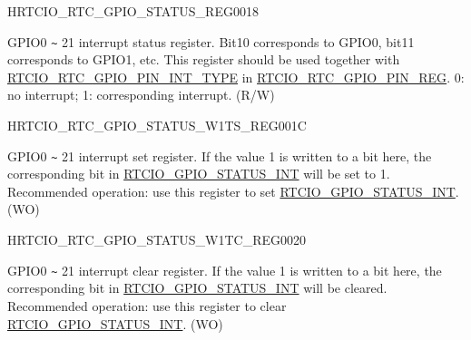 \begin{register}{H}{RTCIO\_RTC\_GPIO\_STATUS\_REG}{\hexprefix{}0018}\label{regdesc:RTCIORTCGPIOSTATUSREG}
%
%
\regnewline%
\begin{regdesc}\begin{reglist}
\label{fielddesc:RTCIOGPIOSTATUSINT}\item [RTCIO\_GPIO\_STATUS\_INT] GPIO0 \verb+~+ 21 interrupt status register. Bit10 corresponds to GPIO0, bit11 corresponds to GPIO1, etc. This register should be used together with \hyperref[fielddesc:RTCIOGPIOPINNINTTYPE]{RTCIO\_RTC\_GPIO\_PIN\_INT\_TYPE} in \hyperref[regdesc:RTCIORTCGPIOPINNREG]{RTCIO\_RTC\_GPIO\_PIN\_REG}.
0: no interrupt; 1: corresponding interrupt. (R/W)
\end{reglist}\end{regdesc}
\end{register}


\begin{register}{H}{RTCIO\_RTC\_GPIO\_STATUS\_W1TS\_REG}{\hexprefix{}001C}\label{regdesc:RTCIORTCGPIOSTATUSW1TSREG}
%
%
\regnewline%
\begin{regdesc}\begin{reglist}
\label{fielddesc:RTCIOGPIOSTATUSINTW1TS}\item [RTCIO\_GPIO\_STATUS\_INT\_W1TS] GPIO0 \verb+~+ 21 interrupt set register. If the value 1 is written to a bit here, the corresponding bit in \hyperref[fielddesc:RTCIOGPIOSTATUSINT]{RTCIO\_GPIO\_STATUS\_INT} will be set to 1. Recommended operation: use this register to set \hyperref[fielddesc:RTCIOGPIOSTATUSINT]{RTCIO\_GPIO\_STATUS\_INT}. (WO)
\end{reglist}\end{regdesc}
\end{register}


\begin{register}{H}{RTCIO\_RTC\_GPIO\_STATUS\_W1TC\_REG}{\hexprefix{}0020}\label{regdesc:RTCIORTCGPIOSTATUSW1TCREG}
%
%
\regnewline%
\begin{regdesc}\begin{reglist}
\label{fielddesc:RTCIOGPIOSTATUSINTW1TC}\item [RTCIO\_GPIO\_STATUS\_INT\_W1TC] GPIO0 \verb+~+ 21 interrupt clear register. If the value 1 is written to a bit here, the corresponding bit in \hyperref[fielddesc:RTCIOGPIOSTATUSINT]{RTCIO\_GPIO\_STATUS\_INT} will be cleared. Recommended operation: use this register to clear \hyperref[fielddesc:RTCIOGPIOSTATUSINT]{RTCIO\_GPIO\_STATUS\_INT}. (WO)
\end{reglist}\end{regdesc}
\end{register}


